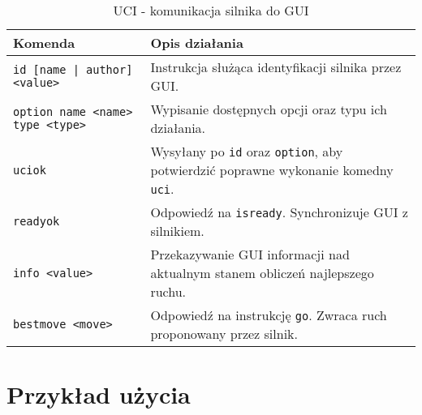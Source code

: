 \begin{table}[htb] \small
\centering
\caption{UCI - komunikacja silnika do GUI}
\label{tab:UCI_silnik_GUI}
\begin{tabularx}{\linewidth}{|p{.35\linewidth}|X|}\hline
\textbf{Komenda} & \textbf{Opis działania} \\ \hline\hline

\texttt{id [name | author] <value>} &
Instrukcja służąca identyfikacji silnika przez GUI. \\ \hline

\texttt{option name <name> type <type>} &
Wypisanie dostępnych opcji oraz typu ich działania. \\ \hline

\texttt{uciok} &
Wysyłany po \texttt{id} oraz \texttt{option}, aby potwierdzić poprawne wykonanie komedny \texttt{uci}. \\ \hline

\texttt{readyok} &
Odpowiedź na \texttt{isready}.
Synchronizuje GUI z silnikiem.\\ \hline

\texttt{info <value>} &
Przekazywanie GUI informacji nad aktualnym stanem obliczeń najlepszego ruchu.\\ \hline

\texttt{bestmove <move>} &
Odpowiedź na instrukcję \texttt{go}.
Zwraca ruch proponowany przez silnik.\\ \hline

\end{tabularx}
\end{table}

\section{Przykład użycia}
\label{sec:przyklad-uzycia}

